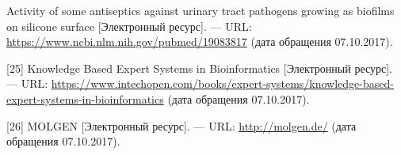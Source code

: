 \documentclass[14pt,a4paper,report]{report}
\begin{document}
\begin{flushleft}
[24] Activity of some antiseptics against urinary tract pathogens growing as biofilms on silicone surface [Электронный ресурс]. — URL: \href{https://www.ncbi.nlm.nih.gov/pubmed/19083817}{https://www.ncbi.nlm.nih.gov/pubmed/19083817} (дата обращения 07.10.2017). \linebreak

[25] Knowledge Based Expert Systems in Bioinformatics [Электронный ресурс]. — URL: \href{https://www.intechopen.com/books/expert-systems/knowledge-based-expert-systems-in-bioinformatics}{https://www.intechopen.com/books/expert-systems/knowledge-based-expert-systems-in-bioinformatics} (дата обращения 07.10.2017). \linebreak

[26] MOLGEN [Электронный ресурс]. — URL: \href{http://molgen.de/}{http://molgen.de/} (дата обращения 07.10.2017). \linebreak


\end{flushleft}
	
\end{document}
